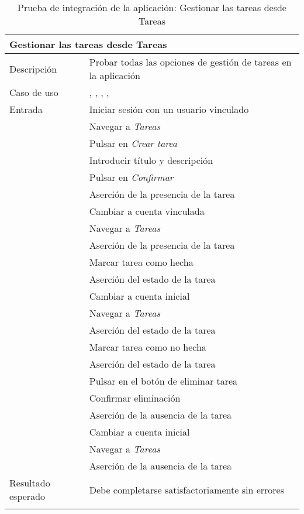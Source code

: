 \begin{longtable}{|p{} p{}|}
    \hline
    \multicolumn{2}{|l|}{\textbf{Gestionar las tareas desde Tareas}} \\ \hline 
    Descripción                 & Probar todas las opciones de gestión de tareas en la aplicación \\ \hline
    Caso de uso                 & \nameref{cu:listar_tareas}, \nameref{cu:crear_tarea}, \nameref{cu:marcar_tarea}, \nameref{cu:desmarcar_tarea}, \nameref{cu:eliminar_tarea} \\ \hline
    Entrada                     & Iniciar sesión con un usuario vinculado \\
                                & Navegar a \emph{Tareas} \\ 
                                & Pulsar en \emph{Crear tarea} \\
                                & Introducir título y descripción \\
                                & Pulsar en \emph{Confirmar} \\
                                & Aserción de la presencia de la tarea \\
                                & Cambiar a cuenta vinculada \\
                                & Navegar a \emph{Tareas} \\ 
                                & Aserción de la presencia de la tarea \\
                                & Marcar tarea como hecha \\
                                & Aserción del estado de la tarea \\
                                & Cambiar a cuenta inicial \\
                                & Navegar a \emph{Tareas} \\ 
                                & Aserción del estado de la tarea \\
                                & Marcar tarea como no hecha \\
                                & Aserción del estado de la tarea \\
                                & Pulsar en el botón de eliminar tarea \\
                                & Confirmar eliminación \\
                                & Aserción de la ausencia de la tarea \\
                                & Cambiar a cuenta inicial \\
                                & Navegar a \emph{Tareas} \\ 
                                & Aserción de la ausencia de la tarea \\
                                \hline
    Resultado esperado          & Debe completarse satisfactoriamente sin errores \\ \hline
    \caption{Prueba de integración de la aplicación: Gestionar las tareas desde Tareas}
    \label{cp:i:app:gestionar_tareas_tasks}
\end{longtable}

